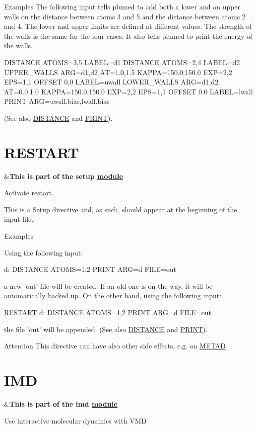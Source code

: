 \begin{DoxyParagraph}{Examples}
The following input tells plumed to add both a lower and an upper walls on the distance between atoms 3 and 5 and the distance between atoms 2 and 4. The lower and upper limits are defined at different values. The strength of the walls is the same for the four cases. It also tells plumed to print the energy of the walls. \begin{DoxyVerb}DISTANCE ATOMS=3,5 LABEL=d1
DISTANCE ATOMS=2,4 LABEL=d2
UPPER_WALLS ARG=d1,d2 AT=1.0,1.5 KAPPA=150.0,150.0 EXP=2,2 EPS=1,1 OFFSET 0,0 LABEL=uwall
LOWER_WALLS ARG=d1,d2 AT=0.0,1.0 KAPPA=150.0,150.0 EXP=2,2 EPS=1,1 OFFSET 0,0 LABEL=lwall
PRINT ARG=uwall.bias,lwall.bias
\end{DoxyVerb}
 (See also \hyperlink{DISTANCE}{D\+I\+S\+T\+A\+N\+C\+E} and \hyperlink{PRINT}{P\+R\+I\+N\+T}). 
\end{DoxyParagraph}
\hypertarget{RESTART}{}\section{R\+E\+S\+T\+A\+R\+T}\label{RESTART}
\begin{TabularC}{2}
\hline
&{\bfseries  This is part of the setup \hyperlink{mymodules}{module }}   \\
\end{TabularC}
Activate restart.

This is a Setup directive and, as such, should appear at the beginning of the input file.

\begin{DoxyParagraph}{Examples}

\end{DoxyParagraph}
Using the following input\+: \begin{DoxyVerb}d: DISTANCE ATOMS=1,2
PRINT ARG=d FILE=out
\end{DoxyVerb}
 a new 'out' file will be created. If an old one is on the way, it will be automatically backed up. On the other hand, using the following input\+: \begin{DoxyVerb}RESTART
d: DISTANCE ATOMS=1,2
PRINT ARG=d FILE=out
\end{DoxyVerb}
 the file 'out' will be appended. (See also \hyperlink{DISTANCE}{D\+I\+S\+T\+A\+N\+C\+E} and \hyperlink{PRINT}{P\+R\+I\+N\+T}).

\begin{DoxyAttention}{Attention}
This directive can have also other side effects, e.\+g. on \hyperlink{METAD}{M\+E\+T\+A\+D} 
\end{DoxyAttention}
\hypertarget{IMD}{}\section{I\+M\+D}\label{IMD}
\begin{TabularC}{2}
\hline
&{\bfseries  This is part of the imd \hyperlink{mymodules}{module }}   \\
\end{TabularC}
Use interactive molecular dynamics with V\+M\+D

